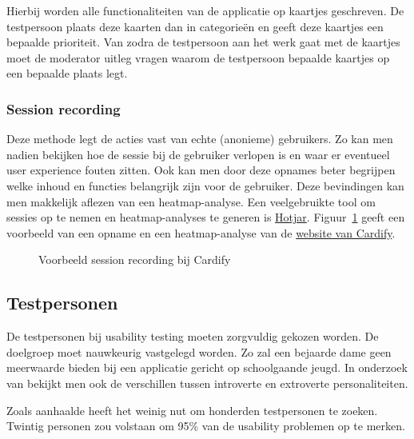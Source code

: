 Hierbij worden alle functionaliteiten van de applicatie op kaartjes geschreven. De testpersoon plaats deze kaarten dan in categorieën en geeft deze kaartjes een bepaalde prioriteit. Van zodra de testpersoon aan het werk gaat met de kaartjes moet de moderator uitleg vragen waarom de testpersoon bepaalde kaartjes op een bepaalde plaats legt. 

\subsubsection{Session recording}
\label{sec:usability-testing:testmethoden:session-recording}

Deze methode legt de acties vast van echte (anonieme) gebruikers. Zo kan men nadien bekijken hoe de sessie bij de gebruiker verlopen is en waar er eventueel user experience fouten zitten. Ook kan men door deze opnames beter begrijpen welke inhoud en functies belangrijk zijn voor de gebruiker. Deze bevindingen kan men makkelijk aflezen van een heatmap-analyse. Een veelgebruikte tool om sessies op te nemen en heatmap-analyses te generen is \href{https://www.hotjar.com/}{Hotjar}. Figuur~\ref{fig:testing-hotjar} geeft een voorbeeld van een opname en een heatmap-analyse van de \href{https://getcardify.com/}{website van Cardify}.

\begin{figure}
    \centering
    \qquad
    \caption{Voorbeeld session recording bij Cardify}
    \label{fig:testing-hotjar}
\end{figure}

\subsection{Testpersonen}

De testpersonen bij usability testing moeten zorgvuldig gekozen worden. De doelgroep moet nauwkeurig vastgelegd worden. Zo zal een bejaarde dame geen meerwaarde bieden bij een applicatie gericht op schoolgaande jeugd. In onderzoek van \textcite{Alnashri2016} bekijkt men ook de verschillen tussen introverte en extroverte personaliteiten.

Zoals \textcite{Faulkner2003} aanhaalde heeft het weinig nut om honderden testpersonen te zoeken. Twintig personen zou volstaan om 95\% van de usability problemen op te merken.

